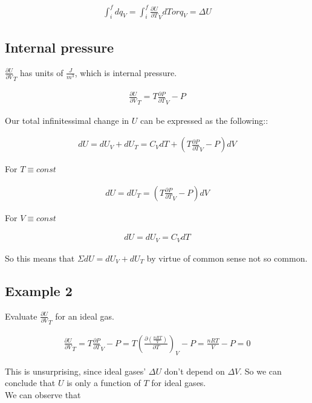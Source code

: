 \documentclass[12pt]{article}
\begin{document}
\begin{align*}
    \int_{i}^{f}dq_V=\int_{i}^{f}\frac{\partial U}{\partial T}_V dT or q_V=\Delta U
\end{align*}

\subsection*{Internal pressure}

$\frac{\partial U}{\partial V}_T$ has units of $\frac{J}{m^3}$, which is internal pressure.

\begin{align*}
    \frac{\partial U}{\partial V}_T=T\frac{\partial P}{\partial T}_V-P
\end{align*}

Our total infinitessimal change in $U$ can be expressed as the following::

\begin{align*}
    dU=dU_V+dU_T=C_V dT+\left(T\frac{\partial P}{\partial T}_V-P\right) dV
\end{align*}

For $T\equiv const$

\begin{align*}
    dU=dU_T=\left(T\frac{\partial P}{\partial T}_V-P\right)dV
\end{align*}

For $V\equiv const$

\begin{align*}
    dU=dU_V=C_V dT
\end{align*}

So this means that $\Sigma dU=dU_V+dU_T$ by virtue of common sense not so common.

\subsection*{Example 2}

Evaluate $\frac{\partial U}{\partial V}_T$ for an ideal gas.

\begin{align*}
    \frac{\partial U}{\partial V}_T=T\frac{\partial P}{\partial T}_V-P=T\left(\frac{\partial \left( \frac{nRT}{V}\right)}{\partial T}\right)_V-P=\frac{nRT}{V}-P=0
\end{align*}

This is unsurprising, since ideal gases' $\Delta U$ don't depend on $\Delta V$. So we can conclude that $U$ is only a function of $T$ for ideal gases.\\We can observe that
\end{document}
